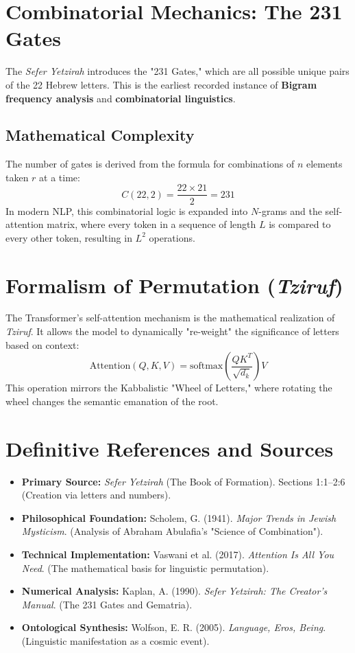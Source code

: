 \documentclass[11pt, letterpaper]{article}
\begin{document}
\section{Combinatorial Mechanics: The 231 Gates}
The \textit{Sefer Yetzirah} introduces the "231 Gates," which are all possible unique pairs of the 22 Hebrew letters. This is the earliest recorded instance of \textbf{Bigram frequency analysis} and \textbf{combinatorial linguistics}.

\subsection{Mathematical Complexity}
The number of gates is derived from the formula for combinations of $n$ elements taken $r$ at a time:
\begin{equation}
C(22, 2) = \frac{22 \times 21}{2} = 231
\end{equation}
In modern NLP, this combinatorial logic is expanded into $N$-grams and the self-attention matrix, where every token in a sequence of length $L$ is compared to every other token, resulting in $L^2$ operations.

\section{Formalism of Permutation (\textit{Tziruf})}
The Transformer's self-attention mechanism is the mathematical realization of \textit{Tziruf}. It allows the model to dynamically "re-weight" the significance of letters based on context:
\begin{equation}
\text{Attention}(Q, K, V) = \text{softmax}\left(\frac{QK^T}{\sqrt{d_k}}\right)V
\end{equation}
This operation mirrors the Kabbalistic "Wheel of Letters," where rotating the wheel changes the semantic emanation of the root.

\section{Definitive References and Sources}
\begin{itemize}[leftmargin=*,labelsep=0.5cm]
    \item \textbf{Primary Source:} \textit{Sefer Yetzirah} (The Book of Formation). Sections 1:1–2:6 (Creation via letters and numbers).
    \item \textbf{Philosophical Foundation:} Scholem, G. (1941). \textit{Major Trends in Jewish Mysticism}. (Analysis of Abraham Abulafia’s "Science of Combination").
    \item \textbf{Technical Implementation:} Vaswani et al. (2017). \textit{Attention Is All You Need}. (The mathematical basis for linguistic permutation).
    \item \textbf{Numerical Analysis:} Kaplan, A. (1990). \textit{Sefer Yetzirah: The Creator's Manual}. (The 231 Gates and Gematria).
    \item \textbf{Ontological Synthesis:} Wolfson, E. R. (2005). \textit{Language, Eros, Being}. (Linguistic manifestation as a cosmic event).
\end{itemize}
\end{document}
